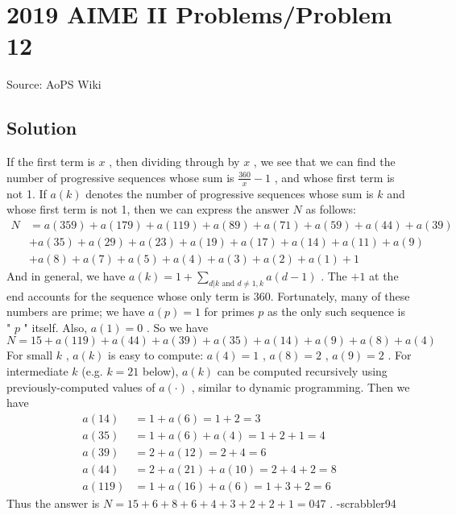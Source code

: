 \documentclass[12pt]{article}
\begin{document}
\section*{{2019 AIME II Problems/Problem 12}}
Source: AoPS Wiki

\subsection*{Solution}
If the first term is $x$ , then dividing through by $x$ , we see that we can find the number of progressive sequences whose sum is $\frac{360}{x} - 1$ , and whose first term is not 1. If $a(k)$ denotes the number of progressive sequences whose sum is $k$ and whose first term is not 1, then we can express the answer $N$ as follows: \begin{align*}N &= a(359) + a(179) + a(119) + a(89) + a(71) + a(59) + a(44) + a(39) \\ &+ a(35) + a(29) + a(23) + a(19) + a(17) + a(14) + a(11) + a(9) \\ &+ a(8) + a(7) + a(5) + a(4) + a(3) + a(2) + a(1) + 1 \end{align*} And in general, we have $a(k) = 1+\sum_{d|k\text{ and } d\ne 1,k}a(d-1)$ . The $+1$ at the end accounts for the sequence whose only term is 360. Fortunately, many of these numbers are prime; we have $a(p) = 1$ for primes $p$ as the only such sequence is " $p$ " itself. Also, $a(1) = 0$ . So we have \[N = 15 + a(119) + a(44) + a(39) + a(35) + a(14) + a(9) + a(8) + a(4)\] For small $k$ , $a(k)$ is easy to compute: $a(4) = 1$ , $a(8) = 2$ , $a(9) = 2$ . For intermediate $k$ (e.g. $k=21$ below), $a(k)$ can be computed recursively using previously-computed values of $a(\cdot)$ , similar to dynamic programming. Then we have \begin{align*} a(14) &= 1+a(6) = 1+2 = 3\\ a(35) &= 1+a(6)+a(4) = 1 + 2 + 1 = 4 \\ a(39) &= 2 + a(12) = 2+4 = 6 \\ a(44) &= 2 + a(21) + a(10) = 2+4+2=8 \\ a(119) &= 1 + a(16) + a(6) = 1 + 3 + 2 = 6 \end{align*} Thus the answer is $N = 15+6+8+6+4+3+2+2+1 = \boxed{047}$ . -scrabbler94
\end{document}
